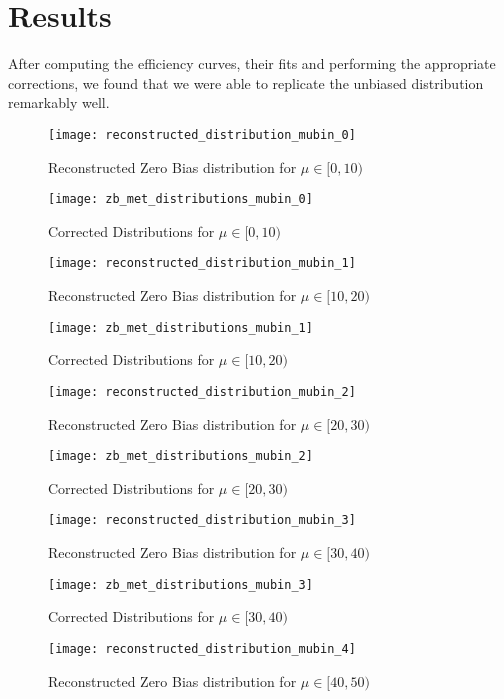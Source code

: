 \section{Results}
After computing the efficiency curves, their fits and performing the appropriate corrections, we found that we were able to replicate the unbiased distribution remarkably well. 
\begin{figure}[h]
		\centering
		\texttt{[image: reconstructed\_distribution\_mubin\_0]}
		\caption{Reconstructed Zero Bias distribution for $\mu\in [0,10)$}
\end{figure}
\begin{figure}[h]
		\centering
		\texttt{[image: zb\_met\_distributions\_mubin\_0]}
		\caption{Corrected Distributions for $\mu \in [0,10)$}
\end{figure}
\begin{figure}[h]
		\centering
		\texttt{[image: reconstructed\_distribution\_mubin\_1]}
		\caption{Reconstructed Zero Bias distribution for $\mu\in [10,20)$}
\end{figure}
\begin{figure}[h]
		\centering
		\texttt{[image: zb\_met\_distributions\_mubin\_1]}
		\caption{Corrected Distributions for $\mu \in [10,20)$}
\end{figure}
\begin{figure}[h]
		\centering
		\texttt{[image: reconstructed\_distribution\_mubin\_2]}
		\caption{Reconstructed Zero Bias distribution for $\mu\in [20,30)$}
\end{figure}
\begin{figure}[h]
		\centering
		\texttt{[image: zb\_met\_distributions\_mubin\_2]}
		\caption{Corrected Distributions for $\mu \in [20,30)$}
\end{figure}
\begin{figure}[h]
		\centering
		\texttt{[image: reconstructed\_distribution\_mubin\_3]}
		\caption{Reconstructed Zero Bias distribution for $\mu\in [30,40)$}
\end{figure}
\begin{figure}[h]
		\centering
		\texttt{[image: zb\_met\_distributions\_mubin\_3]}
		\caption{Corrected Distributions for $\mu \in [30,40)$}
\end{figure}
\begin{figure}[h]
		\centering
		\texttt{[image: reconstructed\_distribution\_mubin\_4]}
		\caption{Reconstructed Zero Bias distribution for $\mu\in [40,50)$}
\end{figure}

